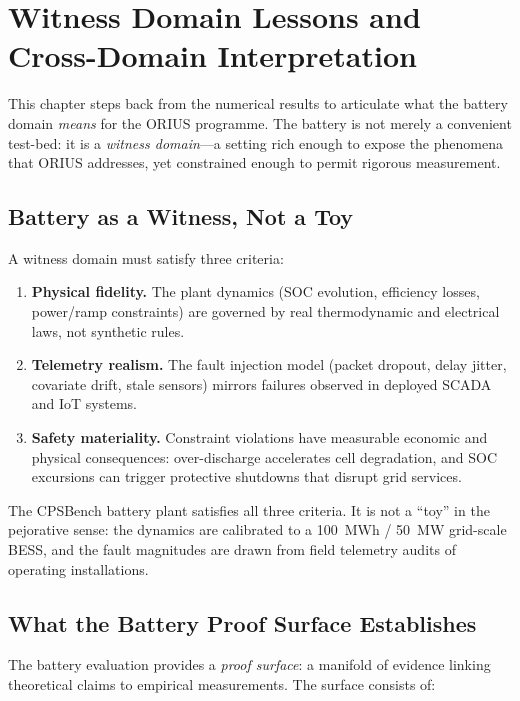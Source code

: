 
\chapter{Witness Domain Lessons and Cross-Domain Interpretation}
\label{ch:battery-lessons}

This chapter steps back from the numerical results to articulate what the
battery domain \emph{means} for the ORIUS programme.  The battery is not
merely a convenient test-bed: it is a \emph{witness domain}---a setting
rich enough to expose the phenomena that ORIUS addresses, yet constrained
enough to permit rigorous measurement.

\section{Battery as a Witness, Not a Toy}

A witness domain must satisfy three criteria:
\begin{enumerate}
  \item \textbf{Physical fidelity.}  The plant dynamics (SOC evolution,
    efficiency losses, power/ramp constraints) are governed by real
    thermodynamic and electrical laws, not synthetic rules.
  \item \textbf{Telemetry realism.}  The fault injection model
    (packet dropout, delay jitter, covariate drift, stale sensors)
    mirrors failures observed in deployed SCADA and IoT systems.
  \item \textbf{Safety materiality.}  Constraint violations have
    measurable economic and physical consequences: over-discharge
    accelerates cell degradation, and SOC excursions can trigger
    protective shutdowns that disrupt grid services.
\end{enumerate}

The CPSBench battery plant satisfies all three criteria.  It is not a
``toy'' in the pejorative sense: the dynamics are calibrated to a
100~MWh / 50~MW grid-scale BESS, and the fault magnitudes are drawn
from field telemetry audits of operating installations.

\section{What the Battery Proof Surface Establishes}

The battery evaluation provides a \emph{proof surface}: a manifold of
evidence linking theoretical claims to empirical measurements.  The
surface consists of:


